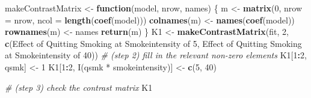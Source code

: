 \documentclass[
  10pt,
]{book}
\newenvironment{Shaded}{\begin{snugshade}}{\end{snugshade}}
\newcommand{\CommentTok}[1]{\textcolor[rgb]{0.56,0.35,0.01}{\textit{#1}}}
\newcommand{\ControlFlowTok}[1]{\textcolor[rgb]{0.13,0.29,0.53}{\textbf{#1}}}
\newcommand{\DataTypeTok}[1]{\textcolor[rgb]{0.13,0.29,0.53}{#1}}
\newcommand{\DecValTok}[1]{\textcolor[rgb]{0.00,0.00,0.81}{#1}}
\newcommand{\KeywordTok}[1]{\textcolor[rgb]{0.13,0.29,0.53}{\textbf{#1}}}
\newcommand{\NormalTok}[1]{#1}
\newcommand{\OperatorTok}[1]{\textcolor[rgb]{0.81,0.36,0.00}{\textbf{#1}}}
\newcommand{\StringTok}[1]{\textcolor[rgb]{0.31,0.60,0.02}{#1}}
\begin{document}
\begin{Shaded}
\begin{Highlighting}[]
\NormalTok{makeContrastMatrix \textless{}{-}}\StringTok{ }\ControlFlowTok{function}\NormalTok{(model, nrow, names) \{}
\NormalTok{  m \textless{}{-}}\StringTok{ }\KeywordTok{matrix}\NormalTok{(}\DecValTok{0}\NormalTok{, }\DataTypeTok{nrow =}\NormalTok{ nrow, }\DataTypeTok{ncol =} \KeywordTok{length}\NormalTok{(}\KeywordTok{coef}\NormalTok{(model)))}
  \KeywordTok{colnames}\NormalTok{(m) \textless{}{-}}\StringTok{ }\KeywordTok{names}\NormalTok{(}\KeywordTok{coef}\NormalTok{(model))}
  \KeywordTok{rownames}\NormalTok{(m) \textless{}{-}}\StringTok{ }\NormalTok{names}
  \KeywordTok{return}\NormalTok{(m)}
\NormalTok{\}}
\NormalTok{K1 \textless{}{-}}\StringTok{ }\KeywordTok{makeContrastMatrix}\NormalTok{(fit, }\DecValTok{2}\NormalTok{, }\KeywordTok{c}\NormalTok{(}\StringTok{\textquotesingle{}Effect of Quitting Smoking at Smokeintensity of 5\textquotesingle{}}\NormalTok{,}
                                      \StringTok{\textquotesingle{}Effect of Quitting Smoking at Smokeintensity of 40\textquotesingle{}}\NormalTok{))}
\CommentTok{\# (step 2) fill in the relevant non{-}zero elements }
\NormalTok{K1[}\DecValTok{1}\OperatorTok{:}\DecValTok{2}\NormalTok{, }\StringTok{\textquotesingle{}qsmk\textquotesingle{}}\NormalTok{] \textless{}{-}}\StringTok{ }\DecValTok{1}
\NormalTok{K1[}\DecValTok{1}\OperatorTok{:}\DecValTok{2}\NormalTok{, }\StringTok{\textquotesingle{}I(qsmk * smokeintensity)\textquotesingle{}}\NormalTok{] \textless{}{-}}\StringTok{ }\KeywordTok{c}\NormalTok{(}\DecValTok{5}\NormalTok{, }\DecValTok{40}\NormalTok{)}

\CommentTok{\# (step 3) check the contrast matrix}
\NormalTok{K1 }
\end{Highlighting}
\end{Shaded}
\end{document}
